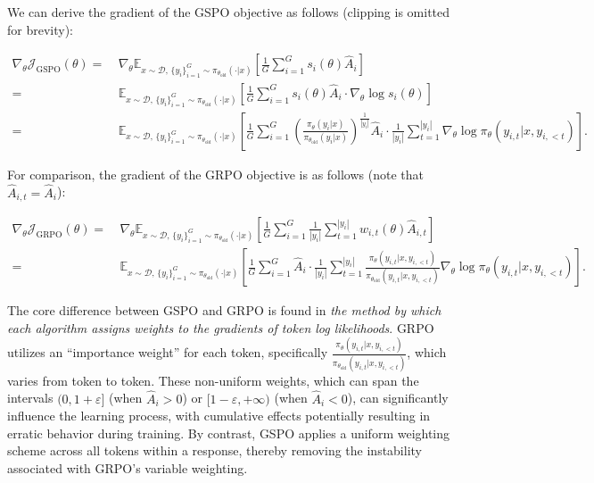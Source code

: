 We can derive the gradient of the GSPO objective as follows (clipping is omitted for brevity):

\begin{align}
\nabla_{\theta} \mathcal{J}_\text{GSPO} (\theta)
=&\ 
\nabla_{\theta} \mathbb{E}_{ x \sim \mathcal{D},\, \{y_i\}_{i=1}^G \sim \pi_{\theta_\text{old}}( \cdot | x) }
\left[ 
\frac{1}{G} \sum_{i=1}^{G} s_{i}(\theta) \widehat{A}_{i}
\right] \\
= &\ 
\mathbb{E}_{ x \sim \mathcal{D},\, \{y_i\}_{i=1}^G \sim \pi_{\theta_\text{old}}( \cdot | x) }
\left[ 
\frac{1}{G} \sum_{i=1}^{G}
s_{i}(\theta) \widehat{A}_{i}
\cdot \nabla_{\theta} \log s_{i}(\theta)
\right] \\
=&\ 
\mathbb{E}_{ x \sim \mathcal{D},\, \{y_i\}_{i=1}^G \sim \pi_{\theta_\text{old}}( \cdot | x) }
\left[ 
\frac{1}{G} \sum_{i=1}^{G} 
\left( \frac{ \pi_{\theta} (y_i | x) }{ \pi_{\theta_\text{old}} (y_i | x)} \right)^{\frac{1}{|y_i|}} \widehat{A}_{i} 
\cdot \frac{1}{|y_i|} \sum_{t=1}^{|y_i|} \nabla_{\theta} \log \pi_{\theta} (y_{i,t} | x, y_{i,<t}) 
\right].
\label{equ:gspo_grad}
\end{align}

For comparison, the gradient of the GRPO objective is as follows (note that $\widehat{A}_{i,t} = \widehat{A}_{i}$):

\begin{align}
\nabla_{\theta} \mathcal{J}_\text{GRPO} (\theta) 
=&\ 
\nabla_{\theta} \mathbb{E}_{ x \sim \mathcal{D},\, \{y_i\}_{i=1}^G \sim \pi_{\theta_\text{old}}( \cdot | x) }
\left[ \frac{1}{G} \sum_{i=1}^{G} \frac{1}{|y_i|} \sum_{t=1}^{|y_i|} 
w_{i,t}(\theta) \widehat{A}_{i,t}
\right] \\
=&\
\mathbb{E}_{ x \sim \mathcal{D},\, \{y_i\}_{i=1}^G \sim \pi_{\theta_\text{old}}( \cdot | x) }
\left[ \frac{1}{G} \sum_{i=1}^{G} \widehat{A}_{i} 
\cdot \frac{1}{|y_i|} \sum_{t=1}^{|y_i|} 
\frac{ \pi_{\theta} (y_{i,t} | x, y_{i,<t}) }{ \pi_{\theta_\text{old}} (y_{i,t} | x,y_{i,<t})} 
\nabla_{\theta} \log \pi_{\theta} (y_{i,t} | x, y_{i,<t})  
\right].
\end{align}

The core difference between GSPO and GRPO is found in \textit{the method by which each algorithm assigns weights to the gradients of token log likelihoods}. GRPO utilizes an ``importance weight'' for each token, specifically $\frac{ \pi_{\theta} (y_{i,t} | x, y_{i,<t}) }{ \pi_{\theta_\text{old}} (y_{i,t} | x,y_{i,<t})}$, which varies from token to token. These non-uniform weights, which can span the intervals $(0, 1+\varepsilon]$ (when $\widehat{A}_{i} >0$) or $[1-\varepsilon, +\infty)$ (when $\widehat{A}_{i} < 0$), can significantly influence the learning process, with cumulative effects potentially resulting in erratic behavior during training. By contrast, GSPO applies a uniform weighting scheme across all tokens within a response, thereby removing the instability associated with GRPO’s variable weighting.

